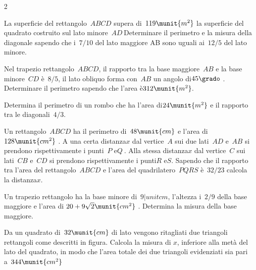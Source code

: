 \begin{htmulticols}{2}
\begin{esercizio}
\label{ese:3.139}
La superficie del rettangolo~\(ABCD\) supera di~\(119\munit{m^2}\) la 
superficie del quadrato costruito sul lato minore~\(AD~\)Determinare il 
perimetro e la misura della diagonale sapendo che i~\(7/10\) del lato 
maggiore AB sono uguali ai~\(12/5\) del lato minore.
\end{esercizio}

\begin{esercizio}
\label{ese:3.140}
Nel trapezio rettangolo~\(ABCD\), il rapporto tra la base maggiore~\(AB\) 
e la base minore~\(CD\) è~\(8/5\), il lato obliquo forma con~\(AB\) un 
angolo di\(45\grado~\). 
Determinare il perimetro sapendo che l'area è\(312\munit{m^2}\).
\end{esercizio}

\begin{esercizio}
\label{ese:3.141}
Determina il perimetro di un rombo che ha l'area di\(24\munit{m^2}\) e il 
rapporto tra le diagonali~\(4/3\).
\end{esercizio}

\begin{esercizio}
\label{ese:3.142}
Un rettangolo~\(ABCD\) ha il perimetro di~\(48\munit{cm}\) e l'area di 
\(128\munit{cm^2}~\). 
A una certa distanza\(x\) dal vertice~\(A\) sui due lati~\(AD\) e~\(AB\) 
si prendono rispettivamente i punti~\(P\) e\( Q~\).
Alla stessa distanza\( x\) dal vertice~\(C\) sui lati~\(CB\) e~\(CD\) si
prendono rispettivamente i punti\( R\) e\( S\). 
Sapendo che il rapporto tra l'area del rettangolo~\(ABCD\) e l'area del 
quadrilatero~\(PQRS\) è~\(32/23\) calcola la distanza\(x\).
\end{esercizio}

\begin{esercizio}
\label{ese:3.143}
Un trapezio rettangolo ha la base minore di~\(9|unit{cm}\), l'altezza 
i~\(2/9\) della base maggiore e l'area di 
\(20 + 9 \sqrt{2}\munit{cm^{2}}~\). 
Determina la misura della base maggiore.
\end{esercizio}

\begin{esercizio}[*]
\label{ese:3.144}
Da un quadrato di~\(32\munit{cm}\) di lato vengono ritagliati due 
triangoli rettangoli come descritti in figura. 
Calcola la misura di \(x\), inferiore alla metà del lato del quadrato, in 
modo che l'area totale dei due triangoli evidenziati sia pari 
a~\(344\munit{cm^2}\)
\immagine{}{\quadri}
%  
\vspace*{-2em}
\end{esercizio}


\end{htmulticols}
